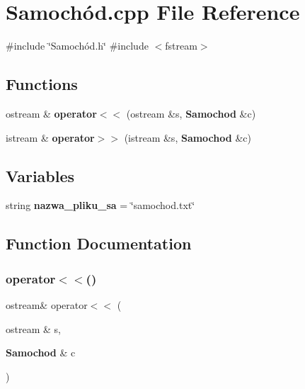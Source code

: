 \section{Samochód.\+cpp File Reference}
\label{_samoch_xC3_xB3d_8cpp}
{\ttfamily \#include \char`\"{}Samochód.\+h\char`\"{}}\newline
{\ttfamily \#include $<$fstream$>$}\newline
\subsection*{Functions}
\begin{DoxyCompactItemize}
\item 
ostream \& \textbf{ operator$<$$<$} (ostream \&s, \textbf{ Samochod} \&c)
\item 
istream \& \textbf{ operator$>$$>$} (istream \&s, \textbf{ Samochod} \&c)
\end{DoxyCompactItemize}
\subsection*{Variables}
\begin{DoxyCompactItemize}
\item 
string \textbf{ nazwa\+\_\+pliku\+\_\+sa} = \char`\"{}samochod.\+txt\char`\"{}
\end{DoxyCompactItemize}


\subsection{Function Documentation}
\mbox{\label{_samoch_xC3_xB3d_8cpp_a6c050739ef12b1dda9845e2d107c61ca}} 
\subsubsection{operator$<$$<$()}
{\footnotesize\ttfamily ostream\& operator$<$$<$ (\begin{DoxyParamCaption}\item[{ostream \&}]{s,  }\item[{\textbf{ Samochod} \&}]{c }\end{DoxyParamCaption})}

\mbox{\label{_samoch_xC3_xB3d_8cpp_a6bf080449778fa75622f3e10731f414d}} 
